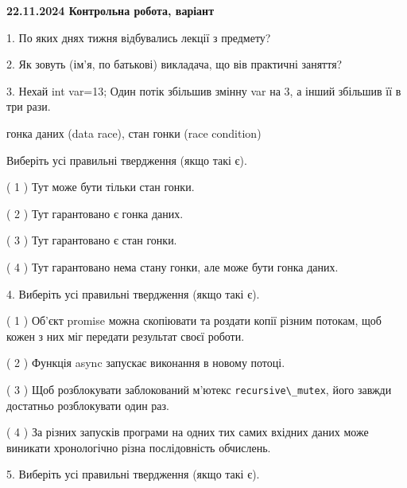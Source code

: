 \documentclass[12pt, ukrainian]{article}
\def\code#1{\Verb!#1!}
\begin{document}
\vspace{4mm}
\newpage
\begin {large}

\textbf{22.11.2024 Контрольна робота, варіант  }\par


{
1. По яких днях тижня відбувались лекції з предмету?



\vspace{5mm}
2. Як зовуть (ім'я, по батькові) викладача, що вів практичні заняття?



\vspace{5mm}
3. Нехай int var=13; Один потік збільшив змінну var на 3, а інший збільшив її в три рази.

гонка даних (data race), стан гонки (race condition)

Виберіть усі правильні твердження (якщо такі є).\par
\vspace{2mm}
( 1 ) Тут може бути тільки стан гонки.%

( 2 ) Тут гарантовано є гонка даних.%

( 3 ) Тут гарантовано є стан гонки.%

( 4 ) Тут гарантовано нема стану гонки, але може бути гонка даних.%


\vspace{5mm}
4. Виберіть усі правильні твердження (якщо такі є).\par
\vspace{2mm}

( 1 ) Об’єкт promise можна скопіювати та роздати копії різним потокам, щоб кожен з них міг передати результат своєї роботи.%

( 2 ) Функція async запускає виконання в новому потоці.%

( 3 ) Щоб розблокувати заблокований м’ютекс \code{recursive\_mutex}, його завжди достатньо розблокувати один раз.%

( 4 ) За різних запусків програми на одних тих самих вхідних даних може виникати хронологічно різна послідовність обчислень.%


\vspace{5mm}
5. Виберіть усі правильні твердження (якщо такі є).\par
\vspace{2mm}

}
\end{large}
\end{document}

